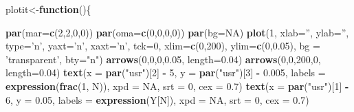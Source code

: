 \documentclass[12pt,twoside]{reedthesis}
\newenvironment{Shaded}{\begin{snugshade}}{\end{snugshade}}
\newcommand{\ControlFlowTok}[1]{\textcolor[rgb]{0.13,0.29,0.53}{\textbf{#1}}}
\newcommand{\DataTypeTok}[1]{\textcolor[rgb]{0.13,0.29,0.53}{#1}}
\newcommand{\DecValTok}[1]{\textcolor[rgb]{0.00,0.00,0.81}{#1}}
\newcommand{\FloatTok}[1]{\textcolor[rgb]{0.00,0.00,0.81}{#1}}
\newcommand{\KeywordTok}[1]{\textcolor[rgb]{0.13,0.29,0.53}{\textbf{#1}}}
\newcommand{\NormalTok}[1]{#1}
\newcommand{\OperatorTok}[1]{\textcolor[rgb]{0.81,0.36,0.00}{\textbf{#1}}}
\newcommand{\OtherTok}[1]{\textcolor[rgb]{0.56,0.35,0.01}{#1}}
\newcommand{\StringTok}[1]{\textcolor[rgb]{0.31,0.60,0.02}{#1}}
\begin{document}
\vspace{0.4cm}
\begin{Shaded}
\begin{Highlighting}[]
\NormalTok{plotit<-}\ControlFlowTok{function}\NormalTok{()\{}

  \KeywordTok{par}\NormalTok{(}\DataTypeTok{mar=}\KeywordTok{c}\NormalTok{(}\DecValTok{2}\NormalTok{,}\DecValTok{2}\NormalTok{,}\DecValTok{0}\NormalTok{,}\DecValTok{0}\NormalTok{))}
  \KeywordTok{par}\NormalTok{(}\DataTypeTok{oma=}\KeywordTok{c}\NormalTok{(}\DecValTok{0}\NormalTok{,}\DecValTok{0}\NormalTok{,}\DecValTok{0}\NormalTok{,}\DecValTok{0}\NormalTok{))}
  \KeywordTok{par}\NormalTok{(}\DataTypeTok{bg=}\OtherTok{NA}\NormalTok{)}
  \KeywordTok{plot}\NormalTok{(}\DecValTok{1}\NormalTok{, }\DataTypeTok{xlab=}\StringTok{''}\NormalTok{, }\DataTypeTok{ylab=}\StringTok{''}\NormalTok{, }\DataTypeTok{type=}\StringTok{'n'}\NormalTok{, }\DataTypeTok{yaxt=}\StringTok{'n'}\NormalTok{, }\DataTypeTok{xaxt=}\StringTok{'n'}\NormalTok{, }\DataTypeTok{tck=}\DecValTok{0}\NormalTok{, }\DataTypeTok{xlim=}\KeywordTok{c}\NormalTok{(}\DecValTok{0}\NormalTok{,}\DecValTok{200}\NormalTok{), }\DataTypeTok{ylim=}\KeywordTok{c}\NormalTok{(}\DecValTok{0}\NormalTok{,}\FloatTok{0.05}\NormalTok{), }\DataTypeTok{bg =} \StringTok{'transparent'}\NormalTok{, }\DataTypeTok{bty=}\StringTok{"n"}\NormalTok{)}
  \KeywordTok{arrows}\NormalTok{(}\DecValTok{0}\NormalTok{,}\DecValTok{0}\NormalTok{,}\DecValTok{0}\NormalTok{,}\FloatTok{0.05}\NormalTok{, }\DataTypeTok{length=}\FloatTok{0.04}\NormalTok{)}
  \KeywordTok{arrows}\NormalTok{(}\DecValTok{0}\NormalTok{,}\DecValTok{0}\NormalTok{,}\DecValTok{200}\NormalTok{,}\DecValTok{0}\NormalTok{, }\DataTypeTok{length=}\FloatTok{0.04}\NormalTok{)}
  \KeywordTok{text}\NormalTok{(}\DataTypeTok{x =} \KeywordTok{par}\NormalTok{(}\StringTok{"usr"}\NormalTok{)[}\DecValTok{2}\NormalTok{] }\OperatorTok{-}\StringTok{ }\DecValTok{5}\NormalTok{,  }\DataTypeTok{y =} \KeywordTok{par}\NormalTok{(}\StringTok{"usr"}\NormalTok{)[}\DecValTok{3}\NormalTok{] }\OperatorTok{-}\StringTok{ }\FloatTok{0.005}\NormalTok{, }\DataTypeTok{labels =} \KeywordTok{expression}\NormalTok{(}\KeywordTok{frac}\NormalTok{(}\DecValTok{1}\NormalTok{, N)), }\DataTypeTok{xpd =} \OtherTok{NA}\NormalTok{, }\DataTypeTok{srt =} \DecValTok{0}\NormalTok{, }\DataTypeTok{cex =} \FloatTok{0.7}\NormalTok{)}
  \KeywordTok{text}\NormalTok{(}\DataTypeTok{x =} \KeywordTok{par}\NormalTok{(}\StringTok{"usr"}\NormalTok{)[}\DecValTok{1}\NormalTok{] }\OperatorTok{-}\StringTok{ }\DecValTok{6}\NormalTok{,  }\DataTypeTok{y =} \FloatTok{0.05}\NormalTok{, }\DataTypeTok{labels =} \KeywordTok{expression}\NormalTok{(Y[N]), }\DataTypeTok{xpd =} \OtherTok{NA}\NormalTok{, }\DataTypeTok{srt =} \DecValTok{0}\NormalTok{, }\DataTypeTok{cex =} \FloatTok{0.7}\NormalTok{)}

\end{Highlighting}
\end{Shaded}
\end{document}
